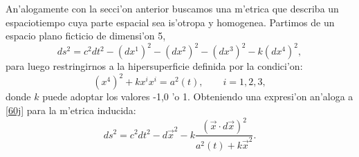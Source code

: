 An'alogamente con la secci'on anterior buscamos una m'etrica que describa un espaciotiempo cuya parte espacial sea is'otropa y homogenea. Partimos de un espacio plano ficticio de dimensi'on 5,
\begin{equation}
 ds^{2}= c^2dt^2 -(dx^{1})^{2}-(dx^{2})^{2}-(dx^{3})^{2}-k(dx^{4})^{2},
 \end{equation}
para luego restringirnos a la hipersuperficie definida por la condici'on:
 \begin{equation}\label{60k}
(x^{4})^{2} +kx^{i}x^{i}=a^{2}(t),\qquad i=1,2,3, 
  \end{equation}
donde $k$ puede adoptar los valores -1,0 'o 1. Obteniendo una expresi'on an'aloga a \eqref{60j} para la m'etrica inducida:
\begin{equation}\label{60kk}
ds^{2}= c^2dt^2 - d\vec{x}^{2} - k\frac{(\vec{x}\cdot d\vec{x})^{2}}{a^{2}(t)+k\vec{x}^{2}}. 
\end{equation}

